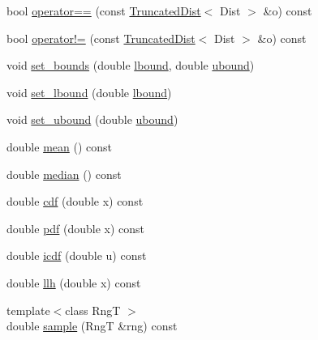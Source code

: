 \begin{DoxyCompactItemize}
bool \hyperlink{classprior__hessian_1_1TruncatedDist_a59cdadfde8f22030f4ab4567b8617ff6}{operator==} (const \hyperlink{classprior__hessian_1_1TruncatedDist}{Truncated\+Dist}$<$ Dist $>$ \&o) const 
\item 
bool \hyperlink{classprior__hessian_1_1TruncatedDist_a05934e74d38db5bd77df1609f43c7d71}{operator!=} (const \hyperlink{classprior__hessian_1_1TruncatedDist}{Truncated\+Dist}$<$ Dist $>$ \&o) const 
\item 
void \hyperlink{classprior__hessian_1_1TruncatedDist_a9189a3e17c4bf37c22aebe327b79dd63}{set\+\_\+bounds} (double \hyperlink{classprior__hessian_1_1TruncatedDist_a9e67788ba67e88cedc65f5166f6448ce}{lbound}, double \hyperlink{classprior__hessian_1_1TruncatedDist_a46cba73068eff4d100e8184deebb8016}{ubound})
\item 
void \hyperlink{classprior__hessian_1_1TruncatedDist_a21ef557361b62e4c657154d12cb032c2}{set\+\_\+lbound} (double \hyperlink{classprior__hessian_1_1TruncatedDist_a9e67788ba67e88cedc65f5166f6448ce}{lbound})
\item 
void \hyperlink{classprior__hessian_1_1TruncatedDist_ac2d919896743958e03a188b5dde6661e}{set\+\_\+ubound} (double \hyperlink{classprior__hessian_1_1TruncatedDist_a46cba73068eff4d100e8184deebb8016}{ubound})
\item 
double \hyperlink{classprior__hessian_1_1TruncatedDist_ac3316d064e154c870bb3b98130cb3252}{mean} () const 
\item 
double \hyperlink{classprior__hessian_1_1TruncatedDist_a566af94b4be2dcc02bee64a33c936015}{median} () const 
\item 
double \hyperlink{classprior__hessian_1_1TruncatedDist_a18b8106ab7e85fe50daa05531c2c9226}{cdf} (double x) const 
\item 
double \hyperlink{classprior__hessian_1_1TruncatedDist_a71d1f8622c8eb4e4758bdbcae1955b80}{pdf} (double x) const 
\item 
double \hyperlink{classprior__hessian_1_1TruncatedDist_a5a2060d31c35b10a97f33375defc78a3}{icdf} (double u) const 
\item 
double \hyperlink{classprior__hessian_1_1TruncatedDist_aed132cecf3591f3842c8400f74a822b7}{llh} (double x) const 
\item 
{\footnotesize template$<$class RngT $>$ }\\double \hyperlink{classprior__hessian_1_1TruncatedDist_aac8ee6fc71aefe73e71152b9d4a5529e}{sample} (RngT \&rng) const 
\end{DoxyCompactItemize}
